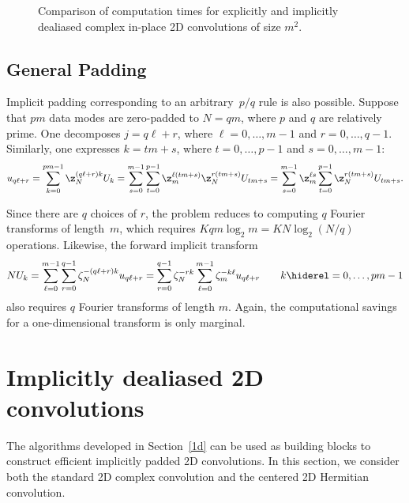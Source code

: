 \documentclass[final]{siamltex}
\def\no{\hiderel}
\begin{document}
\begin{figure}[htbp]
\begin{minipage}{0.49\linewidth}
\begin{center}
\caption{Comparison of computation times for explicitly and implicitly
dealiased complex in-place 2D convolutions of size $m^2$.}
\label{timing2c}
\end{center}
\end{minipage}
\end{figure}

\subsection{General Padding}\label{pq}
Implicit padding corresponding to an arbitrary~$p/q$ rule is also
possible. Suppose that $pm$ data modes are zero-padded to $N=qm$, where $p$
and $q$ are relatively prime. One decomposes $j=q\ell+r$, where
$\ell=0,\dots,m-1$ and $r=0,\dots,q-1$.
Similarly, one expresses $k=t m+s$, where $t=0,\dots,p-1$ and $s=0,\dots, m-1$:
$$
u_{q\ell+r}=\sum_{k=0}^{pm-1}\z_N^{(q\ell+r)k} U_k
=\sum_{s=0}^{m-1}\sum_{t=0}^{p-1} \z_m^{\ell (t m+s)}\z_{N}^{r(t m+s)}
U_{t m+s}
=\sum_{s=0}^{m-1}\z_m^{\ell s}\sum_{t=0}^{p-1}\z_N^{r(t m+s)} U_{t m+s}.
$$

Since there are $q$ choices of $r$, the problem reduces
to computing $q$ Fourier transforms of length~$m$, which requires
$K q m\log_2 m=K N\log_2 (N/q)$ operations. 
Likewise, the forward implicit transform
$$
NU_k
=\sum_{\ell=0}^{m-1}\sum_{r=0}^{q-1} \zeta_N^{-(q\ell+r)k} u_{q\ell+r}
=\sum_{r=0}^{q-1}\zeta_N^{-rk}\sum_{\ell=0}^{m-1}\zeta_m^{-k\ell} u_{q\ell+r}
\qquad k\no =0,\ldots,pm-1
$$
also requires $q$ Fourier transforms of length $m$. Again, the computational
savings for a one-dimensional transform is only marginal.

\section{Implicitly dealiased 2D convolutions}\label{2d}
The algorithms developed in Section~\ref{1d} can be used as building
blocks to construct efficient implicitly padded 2D convolutions.
In this section, we consider both the standard 2D complex convolution and the
centered 2D Hermitian convolution.
\end{document}
